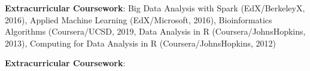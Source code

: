 \noindent\textbf{Extracurricular Coursework}:
    Big Data Analysis with Spark (EdX/BerkeleyX, 2016),
    Applied Machine Learning (EdX/Microsoft, 2016),
    Bioinformatics Algorithms (Coursera/UCSD, 2019,
    Data Analysis in R (Coursera/JohnsHopkins, 2013),
    Computing for Data Analysis in R (Coursera/JohnsHopkins, 2012)


\noindent\textbf{Extracurricular Coursework}:
